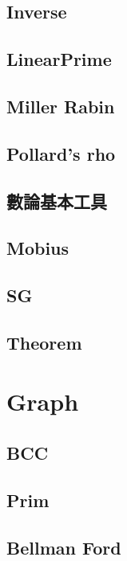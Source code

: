 \subsection{Inverse}

\subsection{LinearPrime}

\subsection{Miller Rabin}

\subsection{Pollard's rho}

\subsection{數論基本工具}

\subsection{Mobius}

\subsection{SG}

\subsection{Theorem}



\section{Graph}

\subsection{BCC}

\subsection{Prim}

\subsection{Bellman Ford}


